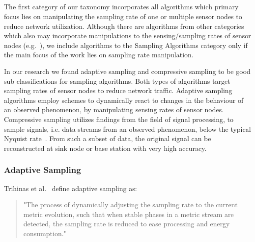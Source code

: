 \FloatBarrier


\subsection{\catI} %
\label{sec:catI}

The first category of our taxonomy incorporates all algorithms which primary
focus lies on manipulating the sampling rate of one or multiple sensor nodes to
reduce network utilization. Although there are algorithms from other categories
which also may incorporate manipulations to the sensing/sampling rates of
sensor nodes (e.g.~\cite{trihinas2015adam, chatterjea2008adaptive}), we include
algorithms to the Sampling Algorithms category only if the main focus of the
work lies on sampling rate manipulation. 


In our research we found adaptive sampling and compressive sampling to be good
sub classifications for sampling algorithms. Both types of algorithms target
sampling rates of sensor nodes to reduce network traffic. Adaptive sampling
algorithms employ schemes to dynamically react to changes in the behaviour of
an observed phenomenon, by manipulating sensing rates of sensor nodes.
Compressive sampling utilizes findings from the field of signal processing, to
sample signals, i.e. data streams from an observed phenomenon, below the
typical Nyquist rate~\cite{candes2008introduction}. From such a subset of data,
the original signal can be reconstructed at sink node or base station with very
high accuracy.

\subsubsection{Adaptive Sampling}
\label{sec:Adaptive Sampling}

Trihinas et al.~\cite{trihinas2015adam} define adaptive sampling as:

\begin{quote}
    "The process of dynamically adjusting the sampling rate to the current
    metric evolution, such that when stable phases in a metric stream are
    detected, the sampling rate is reduced to ease processing and energy
    consumption."
\end{quote}

